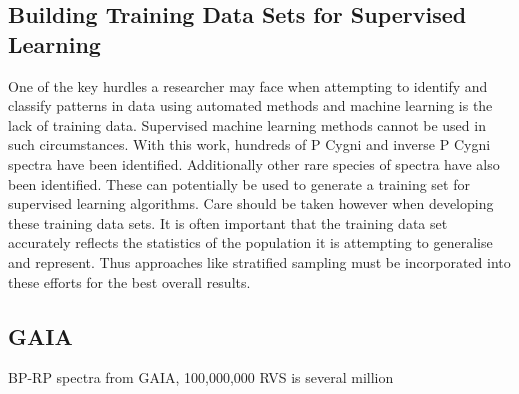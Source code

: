 \subsection{Building Training Data Sets for Supervised Learning}

One of the key hurdles a researcher may face when attempting to identify and classify patterns in data using automated methods and machine learning is the lack of training data. Supervised machine learning methods cannot be used in such circumstances. With this work, hundreds of P Cygni and inverse P Cygni spectra have been identified. Additionally other rare species of spectra have also been identified. These can potentially be used to generate a training set for supervised learning algorithms. Care should be taken however when developing these training data sets. It is often important that the training data set accurately reflects the statistics of the population it is attempting to generalise and represent. Thus approaches like stratified sampling must be incorporated into these efforts for the best overall results. 

\subsection{GAIA}

BP-RP spectra from GAIA, 100,000,000 RVS is several million